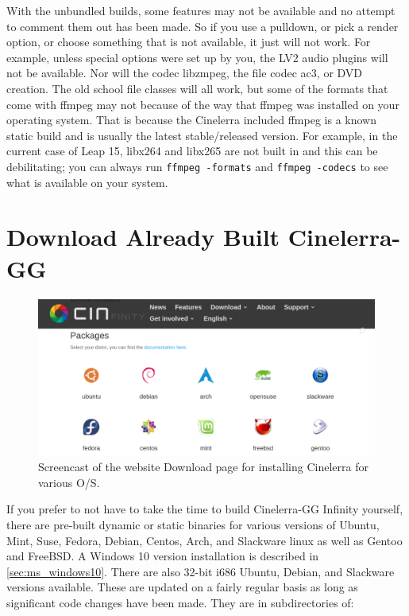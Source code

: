 With the unbundled builds, some features may not be available and no attempt to comment them out has been made.  
So if you use a pulldown, or pick a render option, or choose something that is not available, it just will not work.  
For example, unless special options were set up by you, the LV2 audio plugins will not be available.  
Nor will the codec libzmpeg, the file codec ac3, or DVD creation.  
The old school file classes will all work, but some of the formats that come with ffmpeg may not because of the way that ffmpeg was installed on your operating system.  
That is because the Cinelerra included ffmpeg is a known static build and is usually the latest stable/released version.  
For example, in the current case of Leap 15, libx264 and libx265 are not built in and this can be debilitating; you can always run \texttt{ffmpeg -formats} and \texttt{ffmpeg -codecs} to see what is available on your system.


\section{Download Already Built Cinelerra-GG}%
\label{sec:download_already_built_cinelerra_gg}

\begin{figure}[htpb]
    \centering
    \includegraphics[width=1.0\linewidth]{images/download-distros.png}
    \caption{Screencast of the website Download page for installing Cinelerra for various O/S.}
    \label{fig:download-distros}
\end{figure}

If you prefer to not have to take the time to build Cinelerra-GG Infinity yourself, there are pre-built dynamic or static binaries for various versions of Ubuntu, Mint, Suse, Fedora, Debian, Centos, Arch, and Slackware linux as well as Gentoo and FreeBSD.  
A Windows 10 version installation is described in \ref{sec:ms_windows10}.
There are also 32-bit i686 Ubuntu, Debian, and Slackware versions available.  
These are updated on a fairly regular basis as long as significant code changes have been made.  
They are in subdirectories of:

